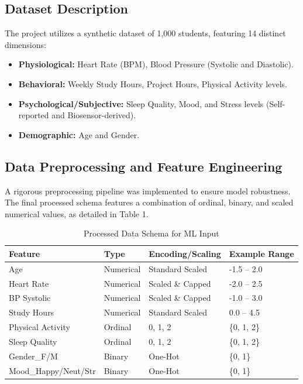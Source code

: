 \documentclass[12pt,a4paper]{article}
\begin{document}
\subsection{Dataset Description}
The project utilizes a synthetic dataset of 1,000 students, featuring 14 distinct dimensions:
\begin{itemize}
    \item \textbf{Physiological:} Heart Rate (BPM), Blood Pressure (Systolic and Diastolic).
    \item \textbf{Behavioral:} Weekly Study Hours, Project Hours, Physical Activity levels.
    \item \textbf{Psychological/Subjective:} Sleep Quality, Mood, and Stress levels (Self-reported and Biosensor-derived).
    \item \textbf{Demographic:} Age and Gender.
\end{itemize}

\subsection{Data Preprocessing and Feature Engineering}
A rigorous preprocessing pipeline was implemented to ensure model robustness. The final processed schema features a combination of ordinal, binary, and scaled numerical values, as detailed in Table 1.

\begin{table}[h]
\centering
\caption{Processed Data Schema for ML Input}
\begin{tabular}{@{}llll@{}}
\toprule
\textbf{Feature} & \textbf{Type} & \textbf{Encoding/Scaling} & \textbf{Example Range} \\ \midrule
Age & Numerical & Standard Scaled & -1.5 -- 2.0 \\
Heart Rate & Numerical & Scaled \& Capped & -2.0 -- 2.5 \\
BP Systolic & Numerical & Scaled \& Capped & -1.0 -- 3.0 \\
Study Hours & Numerical & Standard Scaled & 0.0 -- 4.5 \\
Physical Activity & Ordinal & 0, 1, 2 & \{0, 1, 2\} \\
Sleep Quality & Ordinal & 0, 1, 2 & \{0, 1, 2\} \\
Gender\_F/M & Binary & One-Hot & \{0, 1\} \\
Mood\_Happy/Neut/Str & Binary & One-Hot & \{0, 1\} \\ \bottomrule
\end{tabular}
\end{table}
\end{document}
